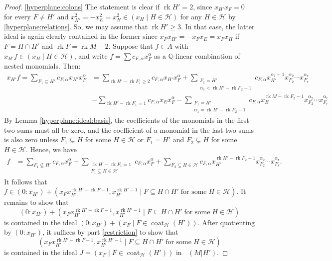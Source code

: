 \documentclass[11pt, reqno]{amsart}
\DeclareMathOperator{\Chow}{\underline{CH}}		%
\DeclareMathOperator{\coat}{coat}
\newcommand{\QQ}{\mathbb{Q}}
\DeclareMathOperator{\rk}{rk}
\theoremstyle{definition}
\numberwithin{equation}{section}
\numberwithin{table}{section}
\begin{document}
\begin{spacing}{1.1}
\begin{proof}
\ref{hyperplane:colons} The statement is clear if $\rk H' = 2$, since $x_{H'}x_F = 0$ for every $F \neq H'$ and $x_{H'}^2 = -x_E^2 = x_H^2 \in (x_H \mid H \in \mathcal{H})$ for any $H \in \mathcal{H}$ by \eqref{hyperplane:relations}.  So, we may assume that $\rk H' \geq 3$.  In that case, the latter ideal is again clearly contained in the former since $x_Fx_{H'} = -x_Fx_E = x_Fx_H$ if $F = H \cap H'$ and $\rk F = \rk M - 2$.  Suppose that $f \in A$ with $x_{H'}f \in (x_H \mid H \in \mathcal{H})$, and write $f = \sum c_{F, \alpha} x_F^\alpha$ as a $\QQ$-linear combination of nested monomials.  Then: 
\begin{align*}
x_{H'}f = \sum_{F_1 \subseteq H'} c_{F, \alpha} x_{H'}x_F^\alpha &= \sum_{\rk H' - \rk F_1 \geq 2} c_{F, \alpha} x_{H'}x_F^\alpha + \sum_{\substack{F_1 = H' \\ \alpha_1 < \rk H' - \rk F_2 -1}} c_{F, \alpha} x_{H'}^{\alpha_1 + 1}x_{F_2}^{\alpha_2} \cdots x_{F_r}^{\alpha_r} \\
&- \sum_{\rk H' - \rk F_1 = 1} c_{F, \alpha} x_Ex_F^\alpha - \sum_{\substack{F_1 = H' \\ \alpha_1 = \rk H' - \rk F_2 -1}} c_{F,\alpha} x_{E}^{\rk M - \rk F_2-1}x_{F_2}^{\alpha_2} \cdots x_{F_r}^{\alpha_r}
\end{align*}
By Lemma \ref{hyperplane:ideal:basis}, the coefficients of the monomials in the first two sums must all be zero, and the coefficient of a monomial in the last two sums is also zero unless $F_1 \subsetneq H$ for some $H \in \mathcal{H}$ or $F_1 = H'$ and $F_2 \subsetneq H$ for some $H \in \mathcal{H}$.  Hence, we have
\begin{align*}
f &= \sum_{F_1 \nsubseteq H'} c_{F, \alpha} x_F^\alpha + \sum_{\substack{\rk H' - \rk F_1 = 1 \\ F_1 \subsetneq H \in \mathcal{H}}} c_{F, \alpha} x_F^\alpha + \sum_{F_2 \subsetneq H \in \mathcal{H}} c_{F, \alpha} x_{H'}^{\rk H' - \rk F_2-1}x_{F_2}^{\alpha_2} \cdots x_{F_r}^{\alpha_r}.
\end{align*}
It follows that $f \in (0 : x_{H'}) + (x_Fx_{H'}^{\rk H' - \rk F -1}, x_{H'}^{\rk H' -1} \mid F \subseteq H \cap H' \;\text{for some}\; H \in \mathcal{H})$.  It remains to show that 
\[
(0 : x_{H'}) + (x_Fx_{H'}^{\rk H' - \rk F -1}, x_{H'}^{\rk H' -1} \mid F \subseteq H \cap H' \;\text{for some}\; H \in \mathcal{H})
\]
is contained in the ideal $(0 : x_{H'}) + (x_F \mid F \in \coat_\mathcal{H}(H'))$.  After quotienting by $(0 : x_{H'})$, it suffices by part \ref{restriction} to show that 
\[
(x_Fx_{H'}^{\rk H' - \rk F -1}, x_{H'}^{\rk H' -1} \mid F \subseteq H \cap H' \;\text{for some}\; H \in \mathcal{H})
\]
is contained in the ideal $J = (x_F \mid F \in \coat_\mathcal{H}(H'))$ in $\Chow(M\vert H')$.


\end{proof}
\end{spacing}
\end{document}
